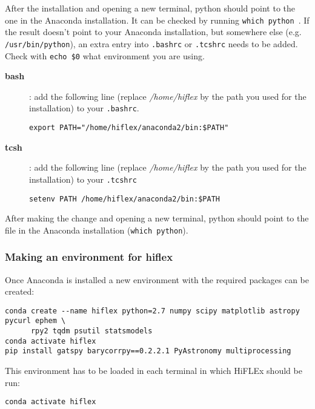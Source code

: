 \documentclass[10pt,a4paper]{article}
\begin{document}
After the installation and opening a new terminal, python should point to the one in the Anaconda installation. It can be checked by running \verb|which python|~. %
If the result doesn't point to your Anaconda installation, but somewhere else (e.g. \verb|/usr/bin/python|), an extra entry into \verb|.bashrc| or \verb|.tcshrc| needs to be added. Check with \verb|echo $0| what environment you are using.
\begin{description}
  \item[\textbf{bash}]: add the following line (replace \textit{/home/hiflex} by the path you used for the installation) to your \verb|.bashrc|. %
    \begin{lstlisting}[style=base]
export PATH="/home/hiflex/anaconda2/bin:$PATH"
    \end{lstlisting}
  \item[\textbf{tcsh}]: add the following line (replace \textit{/home/hiflex} by the path you used for the installation) to your \verb|.tcshrc|
    \begin{lstlisting}[style=base]
setenv PATH /home/hiflex/anaconda2/bin:$PATH
    \end{lstlisting}
\end{description}

After making the change and opening a new terminal, python should point to the file in the Anaconda installation (\verb|which python|).

\subsubsection{Making an environment for hiflex}
\noindent Once Anaconda is installed a new environment with the required packages can be created:

\begin{lstlisting}[style=base]
conda create --name hiflex python=2.7 numpy scipy matplotlib astropy pycurl ephem \
      rpy2 tqdm psutil statsmodels 
conda activate hiflex
pip install gatspy barycorrpy==0.2.2.1 PyAstronomy multiprocessing
\end{lstlisting}

This environment has to be loaded in each terminal in which HiFLEx should be run:
\begin{lstlisting}[style=base]
conda activate hiflex
\end{lstlisting}
\end{document}
